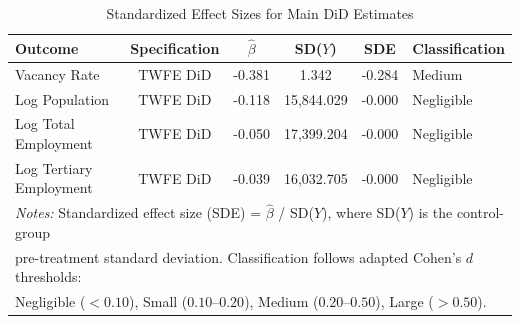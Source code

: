 \begin{table}[htbp]
\centering
\caption{Standardized Effect Sizes for Main DiD Estimates}
\label{tab:sde}
\small
\begin{tabular}{l c c c c l}
\toprule
Outcome & Specification & $\hat{\beta}$ & SD($Y$) & SDE & Classification \\
\midrule
Vacancy Rate & TWFE DiD & -0.381 & 1.342 & -0.284 & Medium \\
Log Population & TWFE DiD & -0.118 & 15,844.029 & -0.000 & Negligible \\
Log Total Employment & TWFE DiD & -0.050 & 17,399.204 & -0.000 & Negligible \\
Log Tertiary Employment & TWFE DiD & -0.039 & 16,032.705 & -0.000 & Negligible \\
\bottomrule
\multicolumn{6}{l}{\footnotesize \textit{Notes:} Standardized effect size (SDE) = $\hat{\beta}$ / SD($Y$), where SD($Y$) is the control-group} \\
\multicolumn{6}{l}{\footnotesize pre-treatment standard deviation. Classification follows adapted Cohen's $d$ thresholds:} \\
\multicolumn{6}{l}{\footnotesize Negligible ($<0.10$), Small ($0.10$--$0.20$), Medium ($0.20$--$0.50$), Large ($>0.50$).} \\
\end{tabular}
\end{table}
